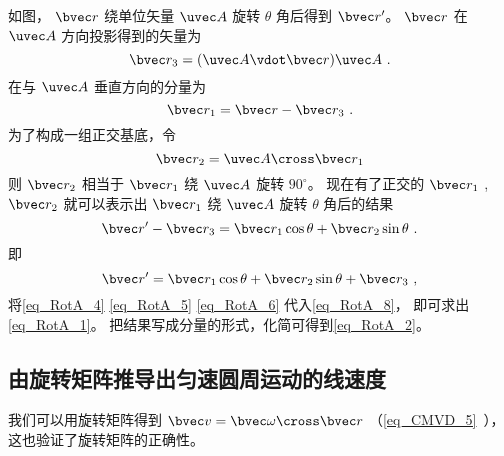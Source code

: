 如图， $\bvec r$ 绕单位矢量 $\uvec A$ 旋转 $\theta$ 角后得到 $\bvec r'$。  $\bvec r$ 在 $\uvec A$ 方向投影得到的矢量为
\begin{equation}\label{eq_RotA_4}
\bvec r_3 = (\uvec A \vdot \bvec r)\uvec A~.
\end{equation}
在与 $\uvec A$ 垂直方向的分量为
\begin{equation}\label{eq_RotA_5}
\bvec r_1 = \bvec r - \bvec r_3~.
\end{equation}
为了构成一组正交基底，令
\begin{equation}\label{eq_RotA_6}
\bvec r_2 = \uvec A \cross \bvec r_1
\end{equation}
则 $\bvec r_2$ 相当于 $\bvec r_1$ 绕 $\uvec A$ 旋转 $90^\circ$。 现在有了正交的 $\bvec r_1$ , $\bvec r_2$  就可以表示出 $\bvec r_1$ 绕 $\uvec A$ 旋转 $\theta$ 角后的结果
\begin{equation}
\bvec r' - \bvec r_3 = \bvec r_1\cos \theta  + \bvec r_2\sin \theta~.
\end{equation}
即
\begin{equation}\label{eq_RotA_8}
\bvec r' = \bvec r_1\cos \theta  + \bvec r_2\sin \theta  + \bvec r_3~,
\end{equation} 
将\autoref{eq_RotA_4} \autoref{eq_RotA_5} \autoref{eq_RotA_6} 代入\autoref{eq_RotA_8}， 即可求出\autoref{eq_RotA_1}。 把结果写成分量的形式，化简可得到\autoref{eq_RotA_2}。

\subsection{由旋转矩阵推导出匀速圆周运动的线速度} 

我们可以用旋转矩阵得到 $\bvec v = \bvec \omega  \cross \bvec r$ （\autoref{eq_CMVD_5}~）， 这也验证了旋转矩阵的正确性。

